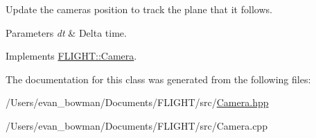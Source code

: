 Update the camera\textquotesingle{}s position to track the plane that it follows. 


\begin{DoxyParams}{Parameters}
{\em dt} & Delta time. \\
\hline
\end{DoxyParams}


Implements \hyperlink{class_f_l_i_g_h_t_1_1_camera_ad634b11d30c62bacf29d7d7bf13d3f0c}{F\+L\+I\+G\+H\+T\+::\+Camera}.



The documentation for this class was generated from the following files\+:\begin{DoxyCompactItemize}
\item 
/\+Users/evan\+\_\+bowman/\+Documents/\+F\+L\+I\+G\+H\+T/src/\hyperlink{_camera_8hpp}{Camera.\+hpp}\item 
/\+Users/evan\+\_\+bowman/\+Documents/\+F\+L\+I\+G\+H\+T/src/Camera.\+cpp\end{DoxyCompactItemize}
